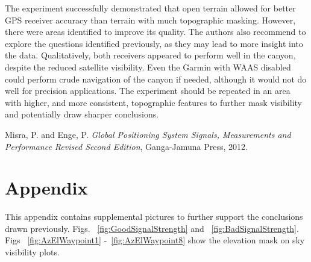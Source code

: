 \documentclass[]{aiaa-tc}%
\begin{document}
	\vspace{5 mm}
	
	\noindent The experiment successfully demonstrated that open terrain allowed for better GPS receiver accuracy than terrain with much topographic masking. However, there were areas identified to improve its quality. The authors also recommend to explore the questions identified previously, as they may lead to more insight into the data. Qualitatively, both receivers appeared to perform well in the canyon, despite the reduced satellite visibility. Even the Garmin with WAAS disabled could perform crude navigation of the canyon if needed, although it would not do well for precision applications. The experiment should be repeated in an area with higher, and more consistent, topographic features to further mask visibility and potentially draw sharper conclusions.
	
	
	\begin{thebibliography}{9}%
		\noindent Misra, P. and Enge, P. \emph{Global Positioning System Signals, Measurements and Performance Revised Second Edition}, Ganga-Jamuna Press, 2012.
		
		
	\end{thebibliography}
	
	\newpage

	\section{Appendix}
	\noindent This appendix contains supplemental pictures to further support the conclusions drawn previously.  Figs. ~\ref{fig:GoodSignalStrength} and ~\ref{fig:BadSignalStrength}. Figs ~\ref{fig:AzElWaypoint1} -~\ref{fig:AzElWaypoint8} show the elevation mask on sky visibility plots.
	
\end{document}
